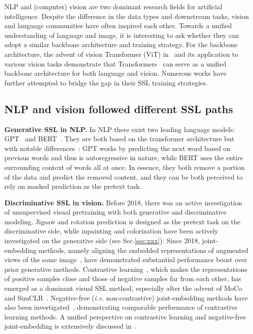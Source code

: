 \documentclass[10pt,journal,compsoc]{IEEEtran}
\begin{document}
NLP and (computer) vision are two dominant research fields for artificial intelligence. Despite the difference in the data types and downstream tasks, vision and language communities have often inspired each other. Towards a unified understanding of language and image, it is interesting to ask whether they can adopt a similar backbone architecture and training strategy. For the backbone architecture, the advent of vision Transformer (ViT) in~\cite{dosovitskiy2021an} and its application to various vision tasks demonstrate that Transformers~\cite{vaswani2017attention} can serve as a unified backbone architecture for both language and vision. Numerous works have further attempted to bridge the gap in their SSL training strategies. 

\subsection{NLP and vision followed different SSL paths} \label{sec:two_paths}
\textbf{Generative SSL in NLP.} In NLP there exist two leading language models: GPT~\cite{radford2018improving,radford2019language,brown2020language} and BERT~\cite{devlin2019bert}. They are both based on the transformer architecture but with notable differences~\cite{bilogur2020notes}: GPT works by predicting the next word based on previous words and thus is autoregressive in nature, while BERT uses the entire surrounding context of words all at once. In essence, they both remove a portion
of the data and predict the removed content, and they can be both perceived to rely on masked prediction as the pretext task. 


\textbf{Discriminative SSL in vision.}
Before 2018, there was an active investigation of unsupervised visual pretraining with both generative and discriminative modeling. Jigsaw and rotation prediction is designed as the pretext task on the discriminative side, while inpainting and colorization have been actively investigated on the generative side (see Sec.\ref{sec:xxx}). Since 2018, joint-embedding methods, namely aligning the embedded representations of augmented views of the same image~\cite{jing2021understanding}, have demonstrated substantial performance boost over prior generative methods. Contrastive learning~\cite{wu2018unsupervised,oord2018representation}, which makes the representations of positive samples close and those of negative samples far from each other, has emerged as a dominant visual SSL method, especially after the advent of MoCo~\cite{he2020momentum} and SimCLR~\cite{chen2020simple}. Negative-free (\textit{i.e.} non-contrastive) joint-embedding methods have also been investigated~\cite{zbontar2021barlow,chen2021exploring,zhang2022how}, demonstrating comparable performance of contrastive learning methods. A unified perspective on contrastive learning and negative-free joint-embedding is extensively discussed in~\cite{zhang2022how,zhang2022dual}.
\end{document}
